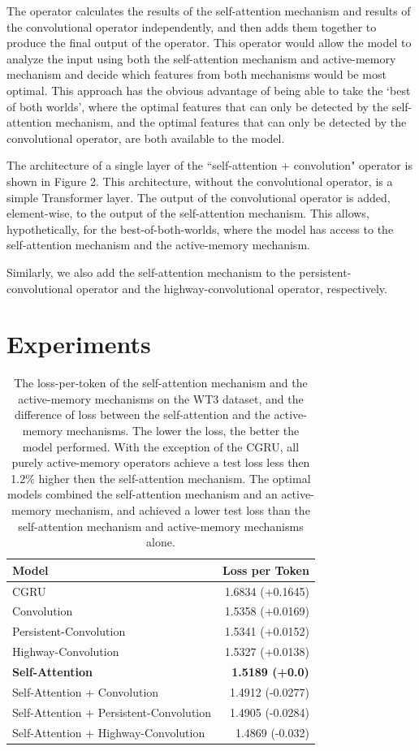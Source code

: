 \documentclass{article}
\begin{document}
The operator calculates the results of the self-attention mechanism and results of the convolutional operator independently, and then adds them together to produce the final output of the operator. This operator would allow the model to analyze the input using both the self-attention mechanism and active-memory mechanism and decide which features from both mechanisms would be most optimal. This approach has the obvious advantage of being able to take the ‘best of both worlds’, where the optimal features that can only be detected by the self-attention mechanism, and the optimal features that can only be detected by the convolutional operator, are both available to the model.

The architecture of a single layer of the ``self-attention + convolution" operator is shown in Figure 2. This architecture, without the convolutional operator, is a simple Transformer layer. The output of the convolutional operator is added, element-wise, to the output of the self-attention mechanism. This allows, hypothetically, for the best-of-both-worlds, where the model has access to the self-attention mechanism and the active-memory mechanism.

Similarly, we also add the self-attention mechanism to the persistent-convolutional operator and the highway-convolutional operator, respectively.

\section{Experiments}

\begin{table}
\centering
\begin{tabular}{lr}  
\toprule
\textbf{Model}  & \textbf{Loss per Token} \\
\midrule
CGRU       & 1.6834 (+0.1645)    \\
Convolution       & 1.5358 (+0.0169)     \\
Persistent-Convolution    & 1.5341 (+0.0152)    \\
Highway-Convolution   & 1.5327 (+0.0138)    \\
\textbf{Self-Attention}   & \textbf{1.5189 (+0.0)}     \\
Self-Attention + Convolution   & 1.4912 (-0.0277)     \\
Self-Attention + Persistent-Convolution   & 1.4905 (-0.0284)     \\
Self-Attention + Highway-Convolution  & 1.4869 (-0.032)     \\
\bottomrule
\end{tabular}
\caption{The loss-per-token of the self-attention mechanism and the active-memory mechanisms on the WT3 dataset, and the difference of loss between the self-attention and the active-memory mechanisms. The lower the loss, the better the model performed. With the exception of the CGRU, all purely active-memory operators achieve a test loss less then 1.2\% higher then the self-attention mechanism. The optimal models combined the self-attention mechanism and an active-memory mechanism, and achieved a lower test loss than the self-attention mechanism and active-memory mechanisms alone.}
\label{tab:booktabs}
\end{table}
\end{document}
